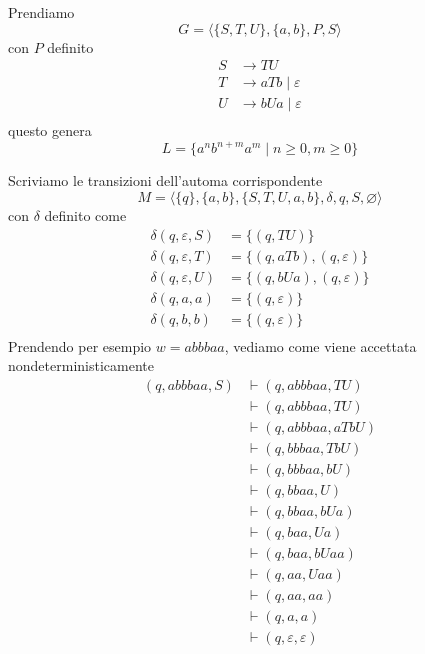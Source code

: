 \documentclass[12pt]{report}
\theoremstyle{definition}
\begin{document}
\begin{tcolorbox}[breakable]
 	Prendiamo
 	$$ G = \langle \{S, T, U\}, \{a, b\}, P, S \rangle $$
 	con $P$ definito
 	\begin{align*}
 		S &\rightarrow TU  \\
 		T &\rightarrow a T b \mid \varepsilon \\
 		U &\rightarrow b U a \mid \varepsilon \\
 	\end{align*}
 	questo genera
 	$$ L = \{ a^n b^{n + m} a^m \mid n \geq 0, m \geq 0 \} $$
 
 	Scriviamo le transizioni dell'automa corrispondente
 	$$ M = \langle \{q\}, \{a, b\}, \{S, T, U, a, b\}, \delta, q, S, \varnothing \rangle $$
 	con $\delta$ definito come
 	\begin{align*}
 		\delta(q, \varepsilon, S) &= \{(q, TU)\} \\
 		\delta(q, \varepsilon, T) &= \{(q, a T b), (q, \varepsilon) \} \\
 		\delta(q, \varepsilon, U) &= \{(q, b U a), (q, \varepsilon) \} \\
 		\delta(q, a, a) &= \{(q, \varepsilon)\} \\
 		\delta(q, b, b) &= \{(q, \varepsilon)\} \\
 	\end{align*}
 	\newpage
 	Prendendo per esempio $w = abbbaa$, vediamo come viene accettata nondeterministicamente
 	\begin{align*}
 		(q, abbbaa, S) &\vdash (q, abbbaa, TU) \\
 		               &\vdash (q, abbbaa, TU) \\
 		               &\vdash (q, abbbaa, aTbU) \\
 		               &\vdash (q, bbbaa, TbU) \\
 		               &\vdash (q, bbbaa, bU) \\
 		               &\vdash (q, bbaa, U) \\
 		               &\vdash (q, bbaa, bUa) \\
 		               &\vdash (q, baa, Ua) \\
		               &\vdash (q, baa, bUaa) \\
 		               &\vdash (q, aa, Uaa) \\
 		               &\vdash (q, aa, aa) \\
 		               &\vdash (q, a, a) \\
 		               &\vdash (q, \varepsilon, \varepsilon) \\

\end{align*}
\end{tcolorbox}
\end{document}

